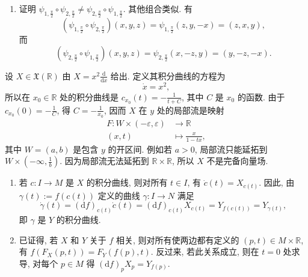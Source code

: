 \begin{description}[font=\normalfont,leftmargin=2em,labelwidth=1.5em]
\begin{enumerate}[label=(\alph*),ref=\alph*,leftmargin=*]
\[
  \psi_{1,t}(x,y,z)=(x,y\cos t-z\sin t,y\sin t+z\cos t).
\]
类似地, 有
\[
  \psi_{2,t}(x,y,z)=(x\cos t+z\sin t,y,-x\sin t+z\cos t)
\]
和
\[
  \psi_{3,t}(x,y,z)=(x\cos t-y\sin t,x\sin t+y\cos t,z).
\]
\item 证明 $\psi_{1,\frac{\pi}{2}}\circ\psi_{2,\frac{\pi}{2}}\ne\psi_{2,\frac{\pi}{2}}\circ\psi_{1,\frac{\pi}{2}}$. 其他组合类似. 有
\[
  (\psi_{1,\frac{\pi}{2}}\circ\psi_{2,\frac{\pi}{2}})(x,y,z)
  =\psi_{1,\frac{\pi}{2}}(z,y,-x)=(z,x,y),
\]
而
\[
  (\psi_{2,\frac{\pi}{2}}\circ\psi_{1,\frac{\pi}{2}})(x,y,z)
  =\psi_{2,\frac{\pi}{2}}(x,-z,y)=(y,-z,-x).
\]
\end{enumerate}

设 $X\in\mathfrak{X}(\mathbb{R})$ 由 $X=x^2\frac{\mathrm{d}}{\mathrm{d}x}$ 给出. 定义其积分曲线的方程为
\[
  \dot x=x^2,
\]
所以在 $x_0\in\mathbb{R}$ 处的积分曲线是 $c_{x_0}(t)=-\frac{1}{t+C}$, 其中 $C$ 是 $x_0$ 的函数. 由于 $c_{x_0}(0)=-\frac{1}{C}$, 得 $C=-\frac{1}{x_0}$, 因而 $X$ 在 $y$ 处的局部流是映射
\[
  \begin{aligned}
  F:W\times(-\varepsilon,\varepsilon)&\to\mathbb{R}\\
  (x,t)&\mapsto\frac{x}{1-tx},
  \end{aligned}
\]
其中 $W=(a,b)$ 是包含 $y$ 的开区间. 例如若 $a>0$, 局部流只能延拓到 $W\times(-\infty,\frac{1}{b})$. 因为局部流无法延拓到 $\mathbb{R}\times\mathbb{R}$, 所以 $X$ 不是完备向量场.

\begin{enumerate}[label=(\alph*),ref=\alph*,leftmargin=*]
\item 若 $c:I\to M$ 是 $X$ 的积分曲线, 则对所有 $t\in I$, 有 $\dot c(t)=X_{c(t)}$. 因此, 由 $\gamma(t):=f(c(t))$ 定义的曲线 $\gamma:I\to N$ 满足
\[
  \dot\gamma(t)=(\mathrm{d}f)_{c(t)}\dot c(t)
  =(\mathrm{d}f)_{c(t)}X_{c(t)}=Y_{f(c(t))}=Y_{\gamma(t)},
\]
即 $\gamma$ 是 $Y$ 的积分曲线.
\item 已证得, 若 $X$ 和 $Y$ 关于 $f$ 相关, 则对所有使两边都有定义的 $(p,t)\in M\times\mathbb{R}$, 有 $f(F_X(p,t))=F_Y(f(p),t)$. 反过来, 若此关系成立, 则在 $t=0$ 处求导, 对每个 $p\in M$ 得 $(\mathrm{d}f)_pX_p=Y_{f(p)}$.
\end{enumerate}


\end{description}

